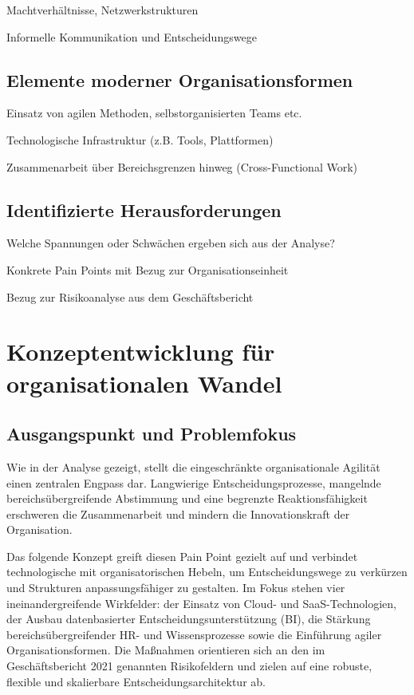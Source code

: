 \documentclass[12pt,a4paper]{article}
\begin{document}
	Machtverhältnisse, Netzwerkstrukturen
	
	Informelle Kommunikation und Entscheidungswege
	\subsection{Elemente moderner Organisationsformen}
	Einsatz von agilen Methoden, selbstorganisierten Teams etc.
	
	Technologische Infrastruktur (z.B. Tools, Plattformen)
	
	Zusammenarbeit über Bereichsgrenzen hinweg (Cross-Functional Work)
	\subsection{Identifizierte Herausforderungen}
	
	Welche Spannungen oder Schwächen ergeben sich aus der Analyse?
	
	Konkrete Pain Points mit Bezug zur Organisationseinheit
	
	Bezug zur Risikoanalyse aus dem Geschäftsbericht
	
\section{Konzeptentwicklung für organisationalen Wandel}

\subsection{Ausgangspunkt und Problemfokus}

Wie in der Analyse gezeigt, stellt die eingeschränkte organisationale Agilität einen zentralen Engpass dar. Langwierige Entscheidungsprozesse, mangelnde bereichsübergreifende Abstimmung und eine begrenzte Reaktionsfähigkeit erschweren die Zusammenarbeit und mindern die Innovationskraft der Organisation.

\noindent Das folgende Konzept greift diesen Pain Point gezielt auf und verbindet technologische mit organisatorischen Hebeln, um Entscheidungswege zu verkürzen und Strukturen anpassungsfähiger zu gestalten. Im Fokus stehen vier ineinandergreifende Wirkfelder: der Einsatz von Cloud- und SaaS-Technologien, der Ausbau datenbasierter Entscheidungsunterstützung (BI), die Stärkung bereichsübergreifender HR- und Wissensprozesse sowie die Einführung agiler Organisationsformen. Die Maßnahmen orientieren sich an den im Geschäftsbericht 2021 genannten Risikofeldern und zielen auf eine robuste, flexible und skalierbare Entscheidungsarchitektur ab.
\end{document}
